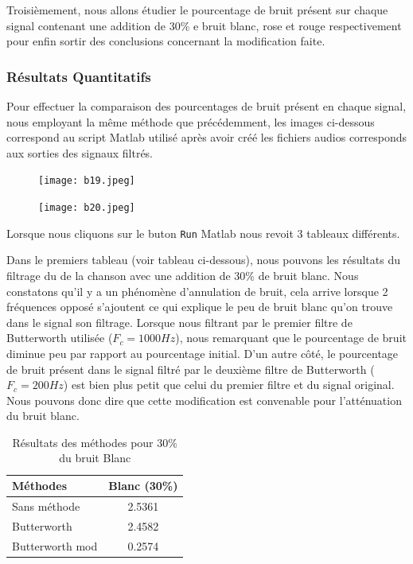 \documentclass[conference,onecolumn]{IEEEtran}
\begin{document}
Troisièmement, nous allons étudier le pourcentage de bruit présent sur chaque signal contenant une addition de 30\% e bruit blanc, rose et rouge respectivement pour enfin sortir des conclusions concernant la modification faite. 

\subsubsection{Résultats Quantitatifs}

Pour effectuer la comparaison des pourcentages de bruit présent en chaque signal, nous employant la même méthode que précédemment, les images ci-dessous correspond au script Matlab utilisé après avoir créé les fichiers audios corresponds aux sorties des signaux filtrés. 

 \begin{figure}[H]
 \centering
    \texttt{[image: b19.jpeg]}
\end{figure}


 \begin{figure}[H]
 \centering
    \texttt{[image: b20.jpeg]}
\end{figure}

Lorsque nous cliquons sur le buton \texttt{Run} Matlab nous revoit 3 tableaux différents. 

Dans le premiers tableau (voir tableau ci-dessous), nous pouvons les résultats du filtrage du de la chanson avec une addition de 30\% de bruit blanc. Nous constatons qu'il y a un phénomène d'annulation de bruit, cela arrive lorsque 2 fréquences opposé s'ajoutent ce qui explique le peu de bruit blanc qu'on trouve dans le signal son filtrage. Lorsque nous filtrant par le premier filtre de Butterworth utilisée ($F_c = 1000 Hz$), nous remarquant que le pourcentage de bruit diminue peu par rapport au pourcentage initial. D'un autre côté, le pourcentage de bruit présent dans le signal filtré par le deuxième filtre de Butterworth ($F_c = 200 Hz$) est bien plus petit que celui du premier filtre et du signal original. Nous pouvons donc dire que cette modification est convenable pour l'atténuation du bruit blanc.

\begin{table}[H]
    \centering
    \begin{tabular}{ l  c }
    \textbf{Méthodes} & \textbf{Blanc (30\%)} \\
    \hline
    Sans méthode &  2.5361\\
    Butterworth &  2.4582\\
    Butterworth mod &  0.2574\\
    \end{tabular}
    \caption{Résultats des méthodes pour 30\% du bruit Blanc}
    \label{table:t7}
\end{table}
\end{document}
